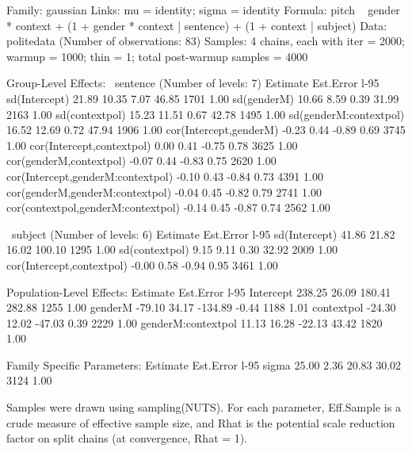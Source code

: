 \documentclass[nobib]{tufte-handout}
\begin{document}
\begin{minipage}[]{1.5\textwidth}
\begin{rc}
Family: gaussian 
  Links: mu = identity; sigma = identity 
Formula: pitch ~ gender * context + (1 + gender * context | sentence) + (1 + context | subject) 
   Data: politedata (Number of observations: 83) 
Samples: 4 chains, each with iter = 2000; warmup = 1000; thin = 1;
         total post-warmup samples = 4000

Group-Level Effects: 
~sentence (Number of levels: 7) 
                                   Estimate Est.Error l-95%
sd(Intercept)                         21.89     10.35     7.07    46.85       1701 1.00
sd(genderM)                           10.66      8.59     0.39    31.99       2163 1.00
sd(contextpol)                        15.23     11.51     0.67    42.78       1495 1.00
sd(genderM:contextpol)                16.52     12.69     0.72    47.94       1906 1.00
cor(Intercept,genderM)                -0.23      0.44    -0.89     0.69       3745 1.00
cor(Intercept,contextpol)              0.00      0.41    -0.75     0.78       3625 1.00
cor(genderM,contextpol)               -0.07      0.44    -0.83     0.75       2620 1.00
cor(Intercept,genderM:contextpol)     -0.10      0.43    -0.84     0.73       4391 1.00
cor(genderM,genderM:contextpol)       -0.04      0.45    -0.82     0.79       2741 1.00
cor(contextpol,genderM:contextpol)    -0.14      0.45    -0.87     0.74       2562 1.00

~subject (Number of levels: 6) 
                          Estimate Est.Error l-95%
sd(Intercept)                41.86     21.82    16.02   100.10       1295 1.00
sd(contextpol)                9.15      9.11     0.30    32.92       2009 1.00
cor(Intercept,contextpol)    -0.00      0.58    -0.94     0.95       3461 1.00

Population-Level Effects: 
                   Estimate Est.Error l-95%
Intercept            238.25     26.09   180.41   282.88       1255 1.00
genderM              -79.10     34.17  -134.89    -0.44       1188 1.01
contextpol           -24.30     12.02   -47.03     0.39       2229 1.00
genderM:contextpol    11.13     16.28   -22.13    43.42       1820 1.00

Family Specific Parameters: 
      Estimate Est.Error l-95%
sigma    25.00      2.36    20.83    30.02       3124 1.00

Samples were drawn using sampling(NUTS). For each parameter, Eff.Sample 
is a crude measure of effective sample size, and Rhat is the potential 
scale reduction factor on split chains (at convergence, Rhat = 1).
\end{rc}
\end{minipage}
\end{document}
